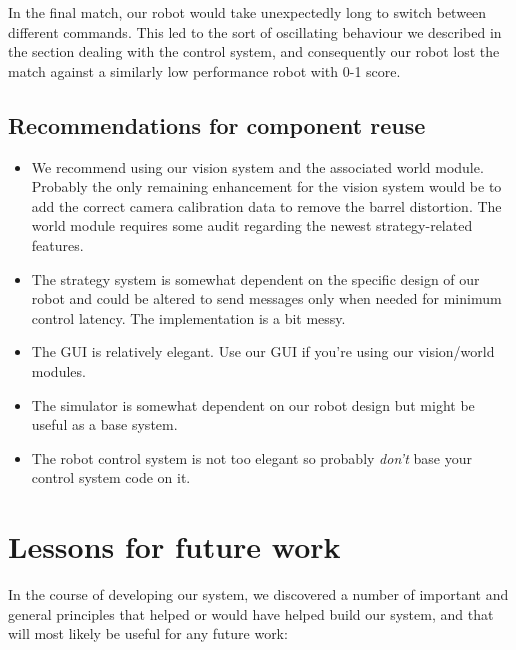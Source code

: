 \documentclass[12pt,a4paper,notitlepage,twocolumn]{report}
\begin{document}
In the final match, our robot would take unexpectedly long to switch
between different commands. This led to the sort of oscillating
behaviour we described in the section dealing with the control system,
and consequently our robot lost the match against a similarly low
performance robot with 0-1 score.

\subsection*{Recommendations for component reuse}
\begin{itemize}
\item We recommend using our vision system and the associated world
  module. Probably the only remaining enhancement for the vision
  system would be to add the correct camera calibration data to remove
  the barrel distortion. The world module requires some audit
  regarding the newest strategy-related features.
\item The strategy system is somewhat dependent on the specific design
  of our robot and could be altered to send messages only when needed
  for minimum control latency. The implementation is a bit messy.
\item The GUI is relatively elegant. Use our GUI if you’re using our
  vision/world modules.
\item The simulator is somewhat dependent on our robot design but
  might be useful as a base system.
\item The robot control system is not too elegant so probably
  \emph{don’t} base your control system code on it.
\end{itemize}

\section*{Lessons for future work}
In the course of developing our system, we discovered a number of
important and general principles that helped or would have helped
build our system, and that will most likely be useful for any future
work:
\end{document}

